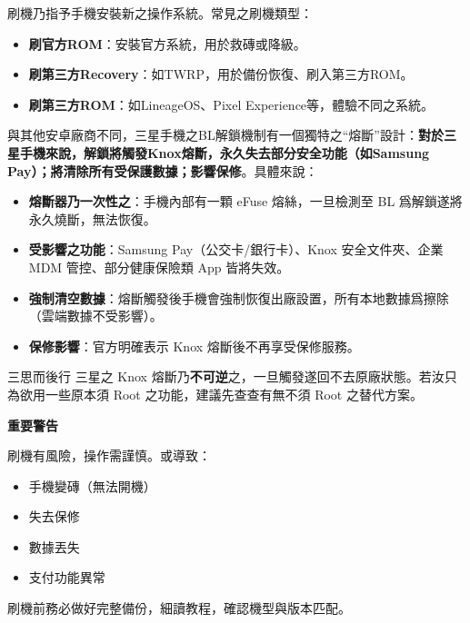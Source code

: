 
刷機乃指予手機安裝新之操作系統。常見之刷機類型：

\begin{itemize}
  \item \textbf{刷官方ROM}：安裝官方系統，用於救磚或降級。
  \item \textbf{刷第三方Recovery}：如TWRP，用於備份恢復、刷入第三方ROM。
  \item \textbf{刷第三方ROM}：如LineageOS、Pixel Experience等，體驗不同之系統。
\end{itemize}


與其他安卓廠商不同，三星手機之BL解鎖機制有一個獨特之“熔斷”設計：\textbf{對於三星手機來說，解鎖將觸發Knox熔斷，永久失去部分安全功能（如Samsung Pay）；將清除所有受保護數據；影響保修}。具體來說：

\begin{itemize}
  \item \textbf{熔斷器乃一次性之}：手機內部有一顆 eFuse 熔絲，一旦檢測至 BL 爲解鎖遂將永久燒斷，無法恢復。
  \item \textbf{受影響之功能}：Samsung Pay（公交卡/銀行卡）、Knox 安全文件夾、企業 MDM 管控、部分健康保險類 App 皆將失效。
  \item \textbf{強制清空數據}：熔斷觸發後手機會強制恢復出廠設置，所有本地數據爲擦除（雲端數據不受影響）。
  \item \textbf{保修影響}：官方明確表示 Knox 熔斷後不再享受保修服務。
\end{itemize}

\begin{tcbwarn}{三思而後行}
三星之 Knox 熔斷乃\textbf{不可逆}之，一旦觸發遂回不去原廠狀態。若汝只為欲用一些原本須 Root 之功能，建議先查查有無不須 Root 之替代方案。

\end{tcbwarn}

\textbf{重要警告}\par

刷機有風險，操作需謹慎。或導致：

\begin{itemize}
  \item 手機變磚（無法開機）
  \item 失去保修
  \item 數據丟失
  \item 支付功能異常
\end{itemize}

刷機前務必做好完整備份，細讀教程，確認機型與版本匹配。

